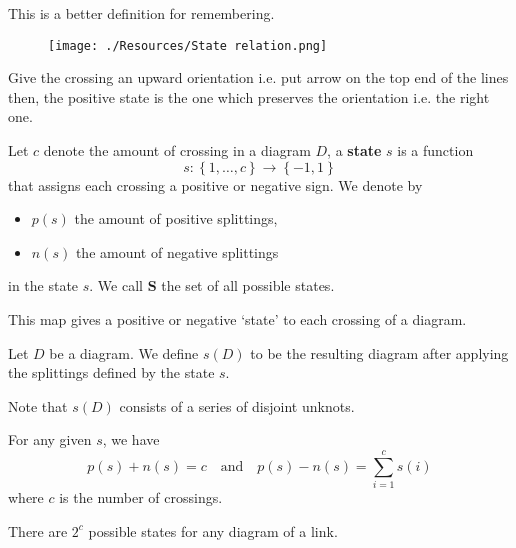 \documentclass[12pt, a4paper]{article}
\begin{document}
\begin{mdremark}
    This is a better definition for remembering.
    \begin{figure}[H]
         \begin{center}
             \texttt{[image: ./Resources/State relation.png]}
         \end{center}
    \end{figure}
    Give the crossing an upward orientation i.e. put arrow on the top end of the lines then, the positive state is the one which preserves the orientation i.e. the right one.
\end{mdremark}

\begin{definition}
    Let \(c\) denote the amount of crossing in a diagram \(D\), a \textbf{state} \(s\) is a function 
    \[s : \left\{ 1,\ldots, c \right\} \to \left\{ -1,1 \right\}\]
    that assigns each crossing a positive or negative sign. We denote by 
    \begin{itemize}
        \item \(p(s)\) the amount of positive splittings,
        \item \(n(s)\) the amount of negative splittings 
    \end{itemize}
    in the state \(s\). We call \(\mathbf{S}\) the set of all possible states.
\end{definition}

\begin{mdnote}
    This map gives a positive or negative `state' to each crossing of a diagram.
\end{mdnote}

\begin{definition}
    Let \(D\) be a diagram. We define \(s(D)\) to be the resulting diagram after applying the splittings defined by the state \(s\).
\end{definition}

\begin{mdremark}
    Note that \(s(D)\) consists of a series of disjoint unknots.
\end{mdremark}

\begin{mdprop}
    For any given \(s\), we have 
    \[p(s)+n(s) = c \quad \text{and} \quad p(s)-n(s) = \sum_{i=1}^{c} s(i)\]
    where \(c\) is the number of crossings.
\end{mdprop}

\begin{proposition}
    There are \(2^c\) possible states for any diagram of a link.
\end{proposition}
\end{document}

